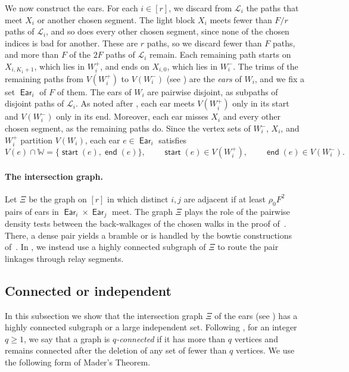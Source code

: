 \documentclass[fontsize=12pt,leading=14pt]{fullpaper}
\DeclareMathOperator{\st}{\mathsf{start}}
\DeclareMathOperator{\en}{\mathsf{end}}
\DeclareMathOperator{\Ear}{\mathsf{Ear}}
\newcommand{\Lcal}{\mathcal{L}}
\newcommand{\WW}{\mathbb{W}}
\begin{document}
We now construct the ears.
For each $i\in[r]$, we discard from $\Lcal_i$ the paths that meet $X_i$ or another chosen segment.
The light block $X_i$ meets fewer than $F/r$ paths of $\Lcal_i$, and so does every other chosen segment, since none of the chosen indices is bad for another.
These are $r$ paths, so we discard fewer than $F$ paths, and more than $F$ of the $2F$ paths of $\Lcal_i$ remain.
Each remaining path starts on $X_{i,K_1+1}$, which lies in $W_i^+$, and ends on $X_{i,0}$, which lies in $W_i^-$.
The trims of the remaining paths from $V(W_i^+)$ to $V(W_i^-)$ (see ) are the \emph{ears} of $W_i$, and we fix a set $\Ear_i$ of $F$ of them.
The ears of $W_i$ are pairwise disjoint, as subpaths of disjoint paths of $\Lcal_i$.
As noted after , each ear meets $V(W_i^+)$ only in its start and $V(W_i^-)$ only in its end.
Moreover, each ear misses $X_i$ and every other chosen segment, as the remaining paths do.
Since the vertex sets of $W_i^-$, $X_i$, and $W_i^+$ partition $V(W_i)$, each ear $e\in\Ear_i$ satisfies
\begin{equation}\label{eq:prep-ear}
  V(e)\cap\WW=\{\st(e),\en(e)\},\qquad\st(e)\in V(W_i^+),\qquad\en(e)\in V(W_i^-).
\end{equation}

\paragraph{The intersection graph.}\label{par:prep-ear-graph}
Let $\Xi$ be the graph on $[r]$ in which distinct $i,j$ are adjacent if at least $\rho_0F^2$ pairs of ears in $\Ear_i\times\Ear_j$ meet.
The graph $\Xi$ plays the role of the pairwise density tests between the back-walkages of the chosen walks in the proof of~\cite[Lemma~4.13]{CLNS26}.
There, a dense pair yields a bramble or is handled by the bowtie constructions of~\cite[Corollary~4.10]{CLNS26}.
In , we instead use a highly connected subgraph of $\Xi$ to route the pair linkages through relay segments.

\subsection{Connected or independent}\label{sec:prep-conn}

In this subsection we show that the intersection graph $\Xi$ of the ears (see ) has a highly connected subgraph or a large independent set.
Following \textcite[Section~1.4]{Diestel17}, for an integer $q\ge1$, we say that a graph is \emph{$q$-connected} if it has more than $q$ vertices and remains connected after the deletion of any set of fewer than $q$ vertices.
We use the following form of Mader's Theorem.
\end{document}
